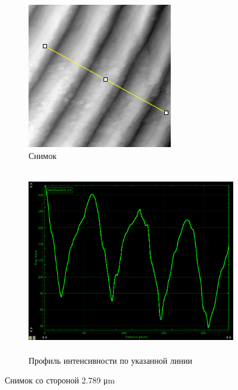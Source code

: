 \documentclass{article}
\begin{document}
\begin{figure}[H]
	\centering
	\begin{subfigure}{0.49\textwidth}
		\centering
		\includegraphics[width = \textwidth, keepaspectratio]{2789-1}
		\caption{Снимок}
		\label{fig:left}
	\end{subfigure}
	\begin{subfigure}{0.49\textwidth}
		\centering
		\includegraphics[width = \textwidth, height=8.09cm]{Plot of 2789}
		\caption{Профиль интенсивности по указанной линии}
		\label{fig:right}
	\end{subfigure}
	\caption{Снимок со стороной 2.789 \unit{\micro\meter}}
	\label{fig:combined}
\end{figure}
\end{document}
